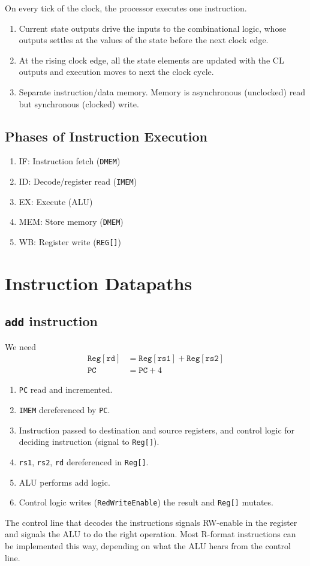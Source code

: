 On every tick of the clock, the processor executes one instruction.

\begin{enumerate}
    \item Current state outputs drive the inputs to the combinational logic, whose outputs settles at the values of the state before the next clock edge.
    \item At the rising clock edge, all the state elements are updated with the CL outputs and execution moves to next the clock cycle.
    \item Separate instruction/data memory. Memory is asynchronous (unclocked) read but synchronous (clocked) write.
\end{enumerate}

\subsection{Phases of Instruction Execution}
\begin{enumerate}
	\item IF: Instruction fetch (\texttt{DMEM})
	\item ID: Decode/register read (\texttt{IMEM})
	\item EX: Execute (ALU)
	\item MEM: Store memory (\texttt{DMEM})
	\item WB: Register write (\texttt{REG[]})
\end{enumerate}

\section{Instruction Datapaths}
\subsection{\texttt{add} instruction}
We need
\begin{align}
\texttt{Reg}\left[\texttt{rd}\right] &= \texttt{Reg}\left[\texttt{rs1}\right] + \texttt{Reg}\left[\texttt{rs2}\right] \\
\texttt{PC} &= \texttt{PC} + 4
\end{align}

\begin{enumerate}
	\item \texttt{PC} read and incremented.
	\item \texttt{IMEM} dereferenced by \texttt{PC}.
	\item Instruction passed to destination and source registers, and control logic for deciding instruction (signal to \texttt{Reg[]}).
	\item \texttt{rs1}, \texttt{rs2}, \texttt{rd} dereferenced in \texttt{Reg[]}.
	\item ALU performs add logic.
	\item Control logic writes (\texttt{RedWriteEnable}) the result and \texttt{Reg[]} mutates.
\end{enumerate}
The control line that decodes the instructions signals RW-enable in the register and signals the ALU to do the right operation. Most R-format instructions can be implemented this way, depending on what the ALU hears from the control line.

